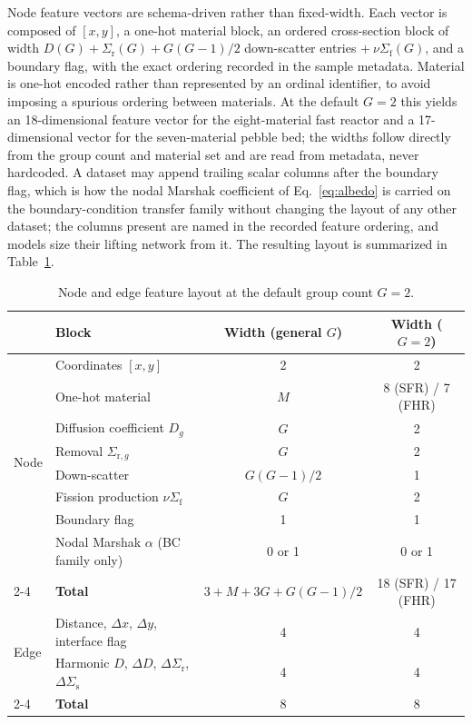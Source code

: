 \documentclass[preprint,12pt]{elsarticle}
\newcommand{\Sig}[1]{\Sigma_{\mathrm{#1}}}
\newcommand{\nuSigf}{\nu\Sigma_{\mathrm{f}}}
\begin{document}
Node feature vectors are schema-driven rather than fixed-width. Each vector is
composed of $[x,y]$, a one-hot material block, an ordered cross-section block of
width $D(G) + \Sig{r}(G) + G(G-1)/2$ down-scatter entries $+\ \nuSigf(G)$, and a
boundary flag, with the exact ordering recorded in the sample metadata. Material
is one-hot encoded rather than represented by an ordinal identifier, to avoid
imposing a spurious ordering between materials. At the default $G=2$ this
yields an 18-dimensional feature vector for the eight-material fast reactor and
a 17-dimensional vector for the seven-material pebble bed; the widths follow
directly from the group count and material set and are read from metadata,
never hardcoded. A dataset may append trailing scalar columns after the boundary
flag, which is how the nodal Marshak coefficient of Eq.~\eqref{eq:albedo} is
carried on the boundary-condition transfer family without changing the layout of
any other dataset; the columns present are named in the recorded feature
ordering, and models size their lifting network from it. The resulting layout is
summarized in Table~\ref{tab:features}.

\begin{table}[htbp]
\centering
\caption{Node and edge feature layout at the default group count $G=2$.}
\label{tab:features}
\begin{tabular}{@{}llcc@{}}
\toprule
& Block & Width (general $G$) & Width ($G=2$) \\
\midrule
\multirow{8}{*}{Node}
 & Coordinates $[x,y]$          & 2                & 2 \\
 & One-hot material             & $M$              & 8 (SFR) / 7 (FHR) \\
 & Diffusion coefficient $D_g$  & $G$              & 2 \\
 & Removal $\Sig{r,\mathit{g}}$ & $G$              & 2 \\
 & Down-scatter                 & $G(G-1)/2$       & 1 \\
 & Fission production $\nuSigf$ & $G$              & 2 \\
 & Boundary flag                & 1                & 1 \\
 & Nodal Marshak $\alpha$ (BC family only) & 0 or 1 & 0 or 1 \\
\cmidrule(l){2-4}
 & \textbf{Total}               & $3+M+3G+G(G-1)/2$ & 18 (SFR) / 17 (FHR) \\
\midrule
\multirow{2}{*}{Edge}
 & Distance, $\Delta x$, $\Delta y$, interface flag & 4 & 4 \\
 & Harmonic $D$, $\Delta D$, $\Delta\Sig{r}$, $\Delta\Sigma_{\mathrm{s}}$ & 4 & 4 \\
\cmidrule(l){2-4}
 & \textbf{Total}               & 8                & 8 \\
\bottomrule
\end{tabular}
\end{table}
\end{document}

